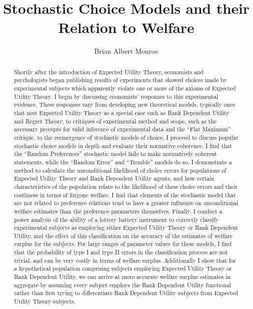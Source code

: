 \documentclass[11pt,a4paper,notitlepage]{report}
\title{Stochastic Choice Models and their Relation to Welfare}
\author{Brian Albert Monroe}
\begin{document}
\maketitle

\doublespacing

\begin{abstract}


Shortly after the introduction of Expected Utility Theory, economists and psychologists began publishing results of experiments that showed choices made by experimental subjects which apparently violate one or more of the axioms of Expected Utility Theory.
I begin by discussing economists' responses to this experimental evidence.
These responses vary from developing new theoretical models, typically ones that nest Expected Utility Theory as a special case such as Rank Dependent Utility and Regret Theory, to critiques of experimental method and scope, such as the necessary precepts for valid inference of experimental data and the \enquote{Flat Maximum} critique, to the reemergence of stochastic models of choice.
I proceed to discuss popular stochastic choice models in depth and evaluate their normative coherence.
I find that the \enquote{Random Preferences} stochastic model fails to make normatively coherent statements, while the \enquote{Random Error} and \enquote{Tremble} models do so.
I demonstrate a method to calculate the unconditional likelihood of choice errors for populations of Expected Utility Theory and Rank Dependent Utility agents, and how certain characteristics of the population relate to the likelihood of these choice errors and their costliness in terms of forgone welfare.
I find that elements of the stochastic model that are not related to preference relations tend to have a greater influence on unconditional welfare estimates than the preference parameters themselves.
Finally, I conduct a power analysis of the ability of a lottery battery instrument to correctly classify experimental subjects as employing either Expected Utility Theory or Rank Dependent Utility, and the effect of this classification on the accuracy of the estimates of welfare surplus for the subjects.
For large ranges of parameter values for these models, I find that the probability of type I and type II errors in the classification process are not trivial, and can be very costly in terms of welfare surplus.
Additionally I show that for a hypothetical population comprising subjects employing Expected Utility Theory or Rank Dependent Utility, we can arrive at more accurate welfare surplus estimates in aggregate by assuming every subject employs the Rank Dependent Utility functional rather than first trying to differentiate Rank Dependent Utility subjects from Expected Utility Theory subjects.

\end{abstract}
\end{document}
